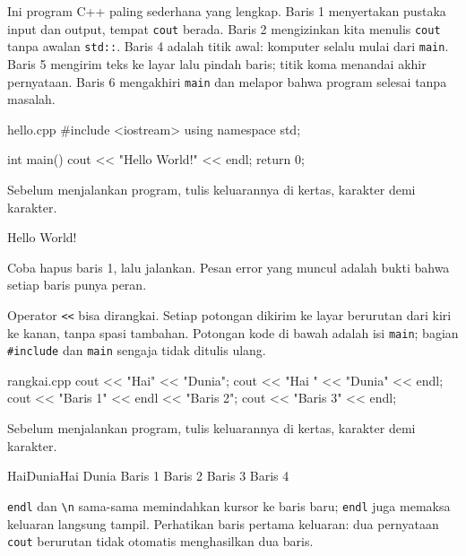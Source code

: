 \documentclass[a4paper]{article}
\begin{document}
Ini program C++ paling sederhana yang lengkap. Baris 1 menyertakan pustaka input dan output, tempat \texttt{cout} berada. Baris 2 mengizinkan kita menulis \texttt{cout} tanpa awalan \texttt{std::}. Baris 4 adalah titik awal: komputer selalu mulai dari \texttt{main}. Baris 5 mengirim teks ke layar lalu pindah baris; titik koma menandai akhir pernyataan. Baris 6 mengakhiri \texttt{main} dan melapor bahwa program selesai tanpa masalah.

\begin{MKode}{hello.cpp}
#include <iostream>
using namespace std;

int main() {
    cout << "Hello World!" << endl;
    return 0;
}
\end{MKode}
\begin{Tebak}[]
Sebelum menjalankan program, tulis keluarannya di kertas, karakter demi karakter.
\end{Tebak}
\begin{Jawaban}[]
\begin{MKeluaran}[]
Hello World!
\end{MKeluaran}

\end{Jawaban}
Coba hapus baris 1, lalu jalankan. Pesan error yang muncul adalah bukti bahwa setiap baris punya peran.

Operator \texttt{<<} bisa dirangkai. Setiap potongan dikirim ke layar berurutan dari kiri ke kanan, tanpa spasi tambahan. Potongan kode di bawah adalah isi \texttt{main}; bagian \texttt{\#include} dan \texttt{main} sengaja tidak ditulis ulang.

\begin{MKode}{rangkai.cpp}
cout << "Hai" << "Dunia";
cout << "Hai " << "Dunia" << endl;
cout << "Baris 1" << endl << "Baris 2\n";
cout << "Baris 3" << endl;
\end{MKode}
\begin{Tebak}[]
Sebelum menjalankan program, tulis keluarannya di kertas, karakter demi karakter.
\end{Tebak}
\begin{Jawaban}[]
\begin{MKeluaran}[]
HaiDuniaHai Dunia
Baris 1
Baris 2
Baris 3
Baris 4
\end{MKeluaran}

\end{Jawaban}
\texttt{endl} dan \texttt{\textbackslash{}n} sama-sama memindahkan kursor ke baris baru; \texttt{endl} juga memaksa keluaran langsung tampil. Perhatikan baris pertama keluaran: dua pernyataan \texttt{cout} berurutan tidak otomatis menghasilkan dua baris.
\end{document}
